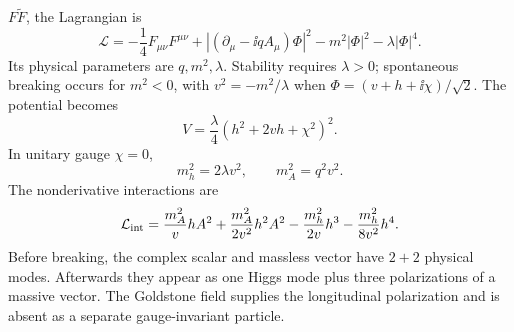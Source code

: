 \begin{enumerate}
\begin{enumerate}
      \(F\widetilde F\), the Lagrangian is
      \[
        \mathcal L=-\frac14F_{\mu\nu}F^{\mu\nu}
          +|(\partial_\mu-\ii qA_\mu)\Phi|^2
          -m^2|\Phi|^2-\lambda|\Phi|^4 .
      \]
      Its physical parameters are \(q,m^2,\lambda\).  Stability requires
      \(\lambda>0\); spontaneous breaking occurs for \(m^2<0\), with
      \(v^2=-m^2/\lambda\) when
      \(\Phi=(v+h+\ii\chi)/\sqrt2\).  The potential becomes
      \[
        V=\frac{\lambda}{4}(h^2+2vh+\chi^2)^2 .
      \]
      In unitary gauge \(\chi=0\),
      \[
        m_h^2=2\lambda v^2,\qquad m_A^2=q^2v^2.
      \]
      The nonderivative interactions are
      \[
        \mathcal L_{\rm int}=
        \frac{m_A^2}{v}hA^2+\frac{m_A^2}{2v^2}h^2A^2
        -\frac{m_h^2}{2v}h^3-\frac{m_h^2}{8v^2}h^4 .
      \]
      Before breaking, the complex scalar and massless vector have
      \(2+2\) physical modes.  Afterwards they appear as one Higgs mode
      plus three polarizations of a massive vector.  The Goldstone field
      supplies the longitudinal polarization and is absent as a separate
      gauge-invariant particle.
  \end{enumerate}


\end{enumerate}
